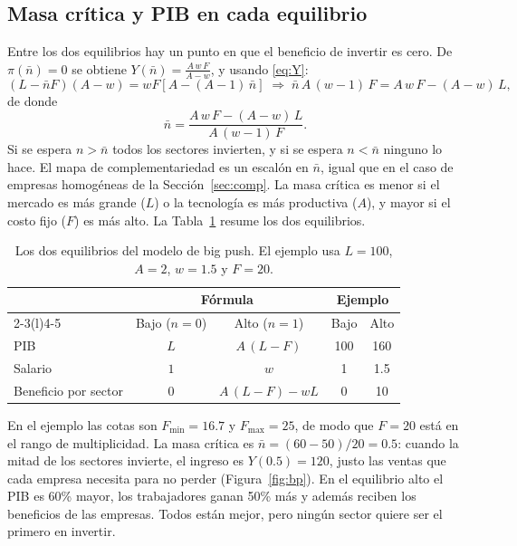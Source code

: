 \documentclass[12pt,letterpaper]{article}
\begin{document}
\subsection{Masa crítica y PIB en cada equilibrio}

Entre los dos equilibrios hay un punto en que el beneficio de invertir es cero. De $\pi(\bar n)=0$ se obtiene $Y(\bar n)=\frac{A\,w\,F}{A-w}$, y usando \eqref{eq:Y}:
\[
  (L-\bar nF)(A-w)=wF\left[A-(A-1)\,\bar n\right]
  \;\Longrightarrow\;
  \bar n\,A\,(w-1)\,F=A\,w\,F-(A-w)\,L ,
\]
de donde
\begin{equation}\label{eq:nbar}
  \bar n=\frac{A\,w\,F-(A-w)\,L}{A\,(w-1)\,F} .
\end{equation}
Si se espera $n>\bar n$ todos los sectores invierten, y si se espera $n<\bar n$ ninguno lo hace. El mapa de complementariedad es un escalón en $\bar n$, igual que en el caso de empresas homogéneas de la Sección~\ref{sec:comp}. La masa crítica es menor si el mercado es más grande ($L$) o la tecnología es más productiva ($A$), y mayor si el costo fijo ($F$) es más alto. La Tabla~\ref{tab:bp} resume los dos equilibrios.

\begin{table}[htb]
\centering
\begin{tabular}{@{}lcccc@{}}
\toprule
 & \multicolumn{2}{c}{Fórmula} & \multicolumn{2}{c}{Ejemplo} \\
\cmidrule(lr){2-3}\cmidrule(l){4-5}
 & Bajo ($n=0$) & Alto ($n=1$) & Bajo & Alto \\
\midrule
PIB & $L$ & $A\,(L-F)$ & 100 & 160 \\
Salario & $1$ & $w$ & 1 & 1.5 \\
Beneficio por sector & $0$ & $A\,(L-F)-wL$ & 0 & 10 \\
\bottomrule
\end{tabular}
\caption{Los dos equilibrios del modelo de big push. El ejemplo usa $L=100$, $A=2$, $w=1.5$ y $F=20$.}
\label{tab:bp}
\end{table}

En el ejemplo las cotas son $F_{\min}=16.7$ y $F_{\max}=25$, de modo que $F=20$ está en el rango de multiplicidad. La masa crítica es $\bar n=(60-50)/20=0.5$: cuando la mitad de los sectores invierte, el ingreso es $Y(0.5)=120$, justo las ventas que cada empresa necesita para no perder (Figura~\ref{fig:bp}). En el equilibrio alto el PIB es 60\% mayor, los trabajadores ganan 50\% más y además reciben los beneficios de las empresas. Todos están mejor, pero ningún sector quiere ser el primero en invertir.
\end{document}
